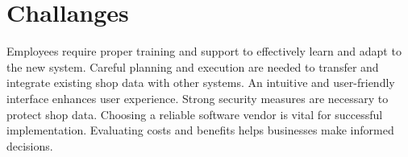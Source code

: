 \section{Challanges}
Employees require proper training and support to effectively learn and adapt to the new system. Careful planning and execution are needed to transfer and integrate existing shop data with other systems. An intuitive and user-friendly interface enhances user experience. Strong security measures are necessary to protect shop data. Choosing a reliable software vendor is vital for successful implementation. Evaluating costs and benefits helps businesses make informed decisions.




